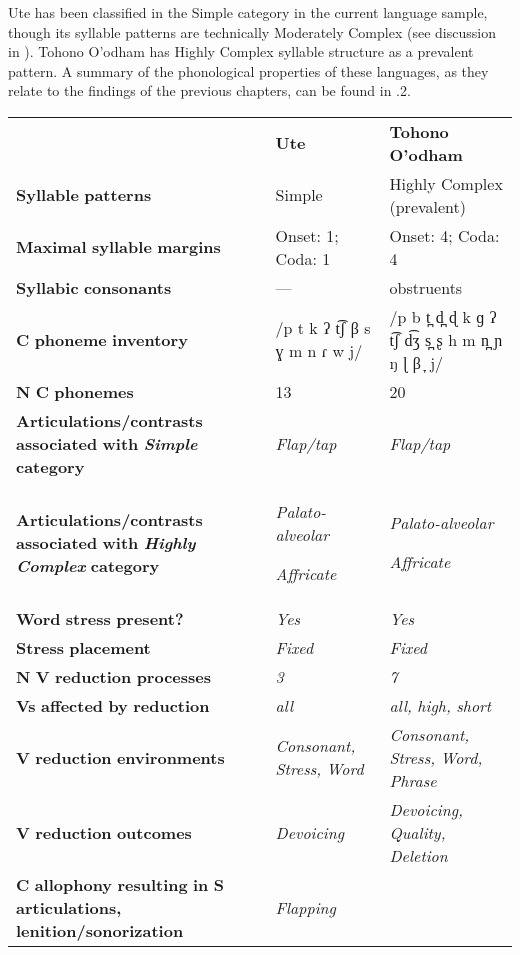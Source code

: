   Ute has been classified in the Simple category in the current language sample, though its syllable patterns are technically Moderately Complex (see discussion in ). Tohono O’odham has Highly Complex syllable structure as a prevalent pattern. A summary of the phonological properties of these languages, as they relate to the findings of the previous chapters, can be found in .2.






\begin{table}
\begin{tabularx}{\textwidth}{XXX}
\lsptoprule
 & \textbf{Ute} & \textbf{Tohono} \textbf{O’odham}\\
 \textbf{Syllable} \textbf{patterns} & Simple & Highly Complex (prevalent)\\
 \textbf{Maximal} \textbf{syllable} \textbf{margins} & Onset: 1; Coda: 1 & Onset: 4; Coda: 4\\
 \textbf{Syllabic} \textbf{consonants} & — & obstruents\\
 \textbf{C} \textbf{phoneme} \textbf{inventory} & /p t k ʔ t͡ʃ β s ɣ m n ɾ w j/ & /p b t̪ d̪ ɖ k ɡ ʔ t͡ʃ d͡ʒ s̪ ʂ h m n̪ ɲ ŋ ɭ β ̞ j/\\
 \textbf{N} \textbf{C} \textbf{phonemes} & 13 & 20\\
 \textbf{Articulations/contrasts} \textbf{associated} \textbf{with} \textbf{\textit{Simple}} \textbf{category} & \textit{Flap/tap} & \textit{Flap/tap}\\
 \textbf{Articulations/contrasts} \textbf{associated} \textbf{with} \textbf{\textit{Highly} \textit{Complex}} \textbf{category} & { \textit{Palato-alveolar}}

 \textit{Affricate} & { \textit{Palato-alveolar}}

 \textit{Affricate}\\
 \textbf{Word} \textbf{stress} \textbf{present?} & \textit{Yes} & \textit{Yes}\\
 \textbf{Stress} \textbf{placement} & \textit{Fixed} & \textit{Fixed}\\
 \textbf{N} \textbf{V} \textbf{reduction} \textbf{processes} & \textit{3} & \textit{7}\\
 \textbf{Vs} \textbf{affected} \textbf{by} \textbf{reduction}  & \textit{all} & \textit{all,} \textit{high,} \textit{short}\\
 \textbf{V} \textbf{reduction} \textbf{environments} & \textit{Consonant,} \textit{Stress,} \textit{Word} & \textit{Consonant,} \textit{Stress,} \textit{Word,} \textit{Phrase}\\
 \textbf{V} \textbf{reduction} \textbf{outcomes} & \textit{Devoicing} & \textit{Devoicing,} \textit{Quality,} \textit{Deletion}\\
 \textbf{C} \textbf{allophony} \textbf{resulting} \textbf{in} \textbf{S} \textbf{articulations,} \textbf{lenition/sonorization} & { \textit{Flapping}}


\end{tabularx}
\end{table}
